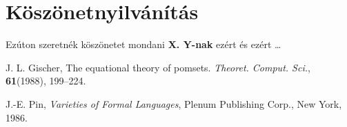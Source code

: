 \documentclass[12pt]{report}
\theoremstyle{definition}
\begin{document}
\chapter*{Köszönetnyilvánítás}

Ezúton szeretnék köszönetet mondani \textbf{X. Y-nak} ezért és ezért \ldots


%
%


\begin{thebibliography}{9}





	J. L. Gischer,
	The equational theory of pomsets.
	\emph{Theoret. Comput. Sci.}, \textbf{61}(1988), 199--224.

	J.-E. Pin,
	\emph{Varieties of Formal Languages},
	Plenum Publishing Corp., New York, 1986.





\end{thebibliography}
\end{document}
